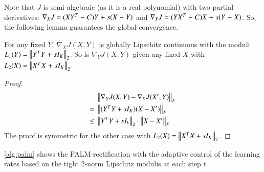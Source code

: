 Note that $J$ is semi\hyp{}algebraic (as it is a real polynomial) with two
partial derivatives: $\nabla_{X}J \mathrel{=} (X Y^T \mathrel{-} C)Y \mathrel{+} s(X\mathrel{-} Y)$ and
$\nabla_{Y}J \mathrel{=} (Y X^T \mathrel{-} C)X \mathrel{+} s(Y \mathrel{-} X)$. So, the following lemma
guarantees the global convergence.
\begin{lemma}
  For any fixed $Y$, $\nabla_{X}J(X, Y)$ is globally Lipschitz continuous with
  the moduli $L_1(Y) \mathrel{=} \left\lVert Y^T Y \mathrel{+} sI_K\right\rVert_2$. So is $\nabla_{Y}J(X, Y)$
  given any fixed $X$ with $L_2(X) \mathrel{=} \left\lVert X^T X \mathrel{+} sI_K\right\rVert_2$.
\end{lemma}
\begingroup
\allowdisplaybreaks
\begin{proof}
	\begin{align*}
		&\left\lVert\nabla_{X}J(X, Y) - \nabla_{X}J(X', Y)\right\rVert_F \\
		\mathrel{=}{} & \left\lVert(Y^TY + sI_K)(X - X')\right\rVert_F \\
		\leq{} & \left\lVert Y^T Y + sI_k\right\rVert_2 \cdot\left\lVert X - X'\right\rVert_F
	\end{align*} 
	The proof is symmetric for the other case with $L_2(X) = \left\lVert X^TX+ sI_K\right\rVert_2$.
\end{proof}
\endgroup
\cref{alg:palm} shows the PALM\hyp{}rectification with the adaptive control of
the learning rates based on the tight 2\hyp{}norm Lipschitz modulis at each step
$t$.